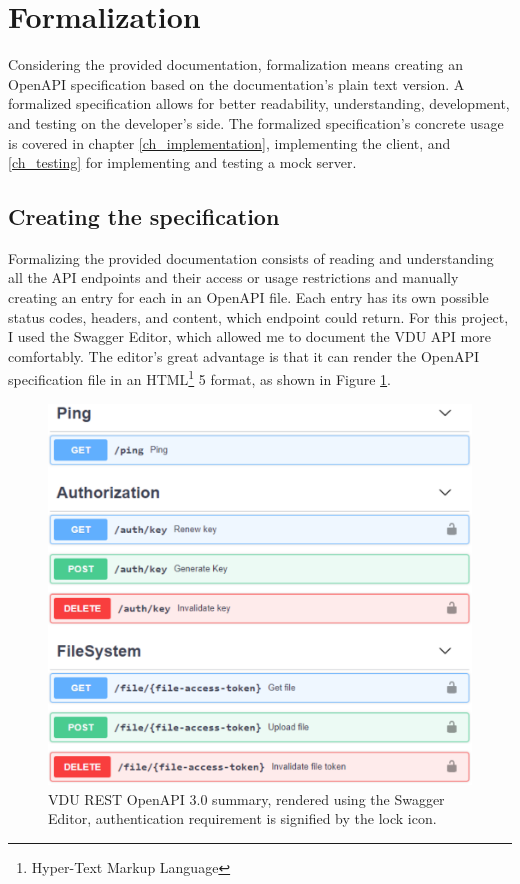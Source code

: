 
\section{Formalization}
Considering the provided documentation, formalization means creating an OpenAPI specification based on the documentation's plain text version. A formalized specification allows for better readability, understanding, development, and testing on the developer's side. The formalized specification's concrete usage is covered in chapter \ref{ch_implementation}, implementing the client, and \ref{ch_testing} for implementing and testing a mock server.

\subsection{Creating the specification}
Formalizing the provided documentation consists of reading and understanding all the API endpoints and their access or usage restrictions and manually creating an entry for each in an OpenAPI file. Each entry has its own possible status codes, headers, and content, which endpoint could return. For this project, I used the Swagger Editor, which allowed me to document the VDU API more comfortably. The editor's great advantage is that it can render the OpenAPI specification file in an HTML\footnote{Hyper-Text Markup Language} 5 format, as shown in Figure \ref{swagger_result}.

\begin{figure}[htb]
	\centering
	\includegraphics[width=\columnwidth]{obrazky-figures/swagger_result.pdf}
	\caption{VDU REST OpenAPI 3.0 summary, rendered using the Swagger Editor, authentication requirement is signified by the lock icon.}
	\label{swagger_result}
\end{figure}

